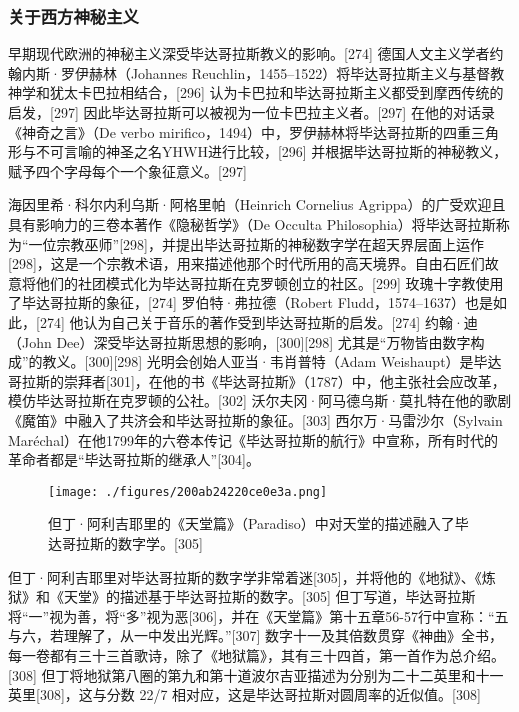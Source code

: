 \subsubsection{关于西方神秘主义}
早期现代欧洲的神秘主义深受毕达哥拉斯教义的影响。[274] 德国人文主义学者约翰内斯·罗伊赫林（Johannes Reuchlin，1455–1522）将毕达哥拉斯主义与基督教神学和犹太卡巴拉相结合，[296] 认为卡巴拉和毕达哥拉斯主义都受到摩西传统的启发，[297] 因此毕达哥拉斯可以被视为一位卡巴拉主义者。[297] 在他的对话录《神奇之言》（De verbo mirifico，1494）中，罗伊赫林将毕达哥拉斯的四重三角形与不可言喻的神圣之名YHWH进行比较，[296] 并根据毕达哥拉斯的神秘教义，赋予四个字母每个一个象征意义。[297]

海因里希·科尔内利乌斯·阿格里帕（Heinrich Cornelius Agrippa）的广受欢迎且具有影响力的三卷本著作《隐秘哲学》（De Occulta Philosophia）将毕达哥拉斯称为“一位宗教巫师”[298]，并提出毕达哥拉斯的神秘数字学在超天界层面上运作[298]，这是一个宗教术语，用来描述他那个时代所用的高天境界。自由石匠们故意将他们的社团模式化为毕达哥拉斯在克罗顿创立的社区。[299] 玫瑰十字教使用了毕达哥拉斯的象征，[274] 罗伯特·弗拉德（Robert Fludd，1574–1637）也是如此，[274] 他认为自己关于音乐的著作受到毕达哥拉斯的启发。[274] 约翰·迪（John Dee）深受毕达哥拉斯思想的影响，[300][298] 尤其是“万物皆由数字构成”的教义。[300][298] 光明会创始人亚当·韦肖普特（Adam Weishaupt）是毕达哥拉斯的崇拜者[301]，在他的书《毕达哥拉斯》（1787）中，他主张社会应改革，模仿毕达哥拉斯在克罗顿的公社。[302] 沃尔夫冈·阿马德乌斯·莫扎特在他的歌剧《魔笛》中融入了共济会和毕达哥拉斯的象征。[303] 西尔万·马雷沙尔（Sylvain Maréchal）在他1799年的六卷本传记《毕达哥拉斯的航行》中宣称，所有时代的革命者都是“毕达哥拉斯的继承人”[304]。


\begin{figure}[ht]
\centering
\texttt{[image: ./figures/200ab24220ce0e3a.png]}
\caption{但丁·阿利吉耶里的《天堂篇》（Paradiso）中对天堂的描述融入了毕达哥拉斯的数字学。[305]} \label{fig_Pythag_18}
\end{figure}
但丁·阿利吉耶里对毕达哥拉斯的数字学非常着迷[305]，并将他的《地狱》、《炼狱》和《天堂》的描述基于毕达哥拉斯的数字。[305] 但丁写道，毕达哥拉斯将“一”视为善，将“多”视为恶[306]，并在《天堂篇》第十五章56-57行中宣称：“五与六，若理解了，从一中发出光辉。”[307] 数字十一及其倍数贯穿《神曲》全书，每一卷都有三十三首歌诗，除了《地狱篇》，其有三十四首，第一首作为总介绍。[308] 但丁将地狱第八圈的第九和第十道波尔吉亚描述为分别为二十二英里和十一英里[308]，这与分数 ⁠ 22/7⁠ 相对应，这是毕达哥拉斯对圆周率的近似值。[308]


